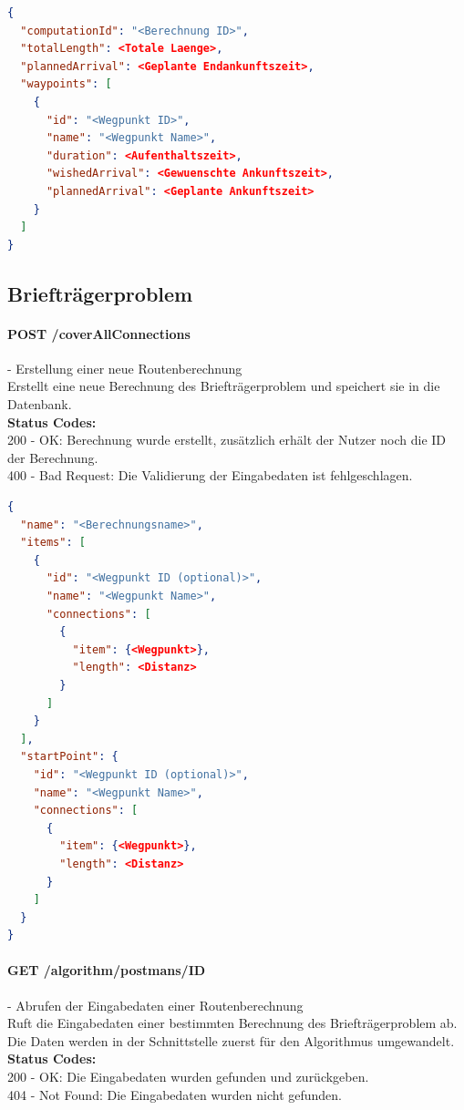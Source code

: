 \begin{lstlisting}[language=JSON, caption=Beispiel eines Endresultates für das Problem des Handlungsreisenden, label=lst:solution_tsp]  
{
  "computationId": "<Berechnung ID>",
  "totalLength": <Totale Laenge>,
  "plannedArrival": <Geplante Endankunftszeit>,
  "waypoints": [
    {
      "id": "<Wegpunkt ID>",
      "name": "<Wegpunkt Name>",
      "duration": <Aufenthaltszeit>,
      "wishedArrival": <Gewuenschte Ankunftszeit>,
      "plannedArrival": <Geplante Ankunftszeit>
    }
  ]
}
\end{lstlisting}

%
%
%
%

\subsection{Briefträgerproblem}

\paragraph{POST /coverAllConnections} - Erstellung einer neue Routenberechnung\mbox{}\\
Erstellt eine neue Berechnung des Briefträgerproblem und speichert sie in die Datenbank.\\
\textbf{Status Codes:}\\
200 - OK: Berechnung wurde erstellt, zusätzlich erhält der Nutzer noch die ID der Berechnung.\\
400 - Bad Request: Die Validierung der Eingabedaten ist fehlgeschlagen.\\

\begin{lstlisting}[language=JSON, caption=Beispiel einer Eingabe für das Briefträgerproblem, label=lst:input_postman]  
{
  "name": "<Berechnungsname>",
  "items": [
    {
      "id": "<Wegpunkt ID (optional)>",
      "name": "<Wegpunkt Name>",
      "connections": [
        {
          "item": {<Wegpunkt>},
          "length": <Distanz>
        }
      ]
    }
  ],
  "startPoint": {
    "id": "<Wegpunkt ID (optional)>",
    "name": "<Wegpunkt Name>",
    "connections": [
      {
        "item": {<Wegpunkt>},
        "length": <Distanz>
      }
    ]
  }
}
\end{lstlisting}

\paragraph{GET /algorithm/postmans/{ID}} - Abrufen der Eingabedaten einer Routenberechnung\mbox{}\\
Ruft die Eingabedaten einer bestimmten Berechnung des Briefträgerproblem ab. Die Daten werden in der Schnittstelle zuerst für den Algorithmus umgewandelt.\\
\textbf{Status Codes:}\\
200 - OK: Die Eingabedaten wurden gefunden und zurückgeben.\\
404 - Not Found: Die Eingabedaten wurden nicht gefunden.\\

